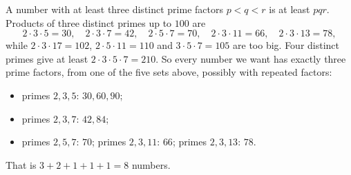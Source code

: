 A number with at least three distinct prime factors $p<q<r$ is at least $pqr$. Products of three distinct primes up to $100$ are
\[
2\cdot3\cdot5=30,\quad 2\cdot3\cdot7=42,\quad 2\cdot5\cdot7=70,\quad 2\cdot3\cdot11=66,\quad 2\cdot3\cdot13=78,
\]
while $2\cdot3\cdot17=102$, $2\cdot5\cdot11=110$ and $3\cdot5\cdot7=105$ are too big. Four distinct primes give at least $2\cdot3\cdot5\cdot7=210$. So every number we want has exactly three prime factors, from one of the five sets above, possibly with repeated factors:
\begin{itemize}
\item primes $2,3,5$: $30,60,90$;
\item primes $2,3,7$: $42,84$;
\item primes $2,5,7$: $70$; primes $2,3,11$: $66$; primes $2,3,13$: $78$.
\end{itemize}
That is $3+2+1+1+1=\boxed{8}$ numbers.
